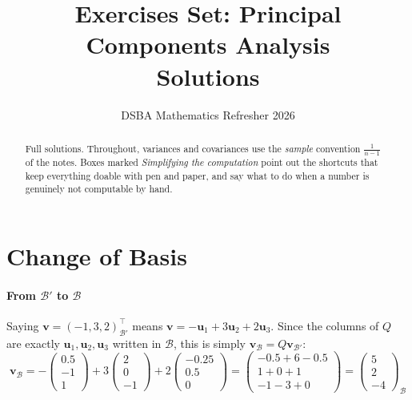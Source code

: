 \documentclass[]{article}
\title{Exercises Set: Principal Components Analysis\\ \large Solutions}
\author{DSBA Mathematics Refresher 2026}
\date{}
\begin{document}
	\maketitle

	\begin{abstract}
		Full solutions.
		Throughout, variances and covariances use the \emph{sample} convention $\frac{1}{n-1}$ of the notes.
		Boxes marked \textit{Simplifying the computation} point out the shortcuts that keep everything doable with pen and paper, and say what to do when a number is genuinely not computable by hand.
	\end{abstract}

	\section{Change of Basis}

	\paragraph{From $\mathcal{B}'$ to $\mathcal{B}$}\mbox{}

	Saying $\mathbf{v} = (-1, 3, 2)^\top_{\mathcal{B}'}$ means $\mathbf{v} = -\mathbf{u}_1 + 3\mathbf{u}_2 + 2\mathbf{u}_3$.
	Since the columns of $Q$ are exactly $\mathbf{u}_1, \mathbf{u}_2, \mathbf{u}_3$ written in $\mathcal{B}$, this is simply $\mathbf{v}_\mathcal{B} = Q \mathbf{v}_{\mathcal{B}'}$:
	$$
	\mathbf{v}_{\mathcal{B}}
	= -\begin{pmatrix} 0.5 \\ -1 \\ 1 \end{pmatrix}
	+ 3\begin{pmatrix} 2 \\ 0 \\ -1 \end{pmatrix}
	+ 2\begin{pmatrix} -0.25 \\ 0.5 \\ 0 \end{pmatrix}
	= \begin{pmatrix} -0.5 + 6 - 0.5 \\ 1 + 0 + 1 \\ -1 - 3 + 0 \end{pmatrix}
	= \begin{pmatrix} 5 \\ 2 \\ -4 \end{pmatrix}_{\mathcal{B}}
	$$
\end{document}
